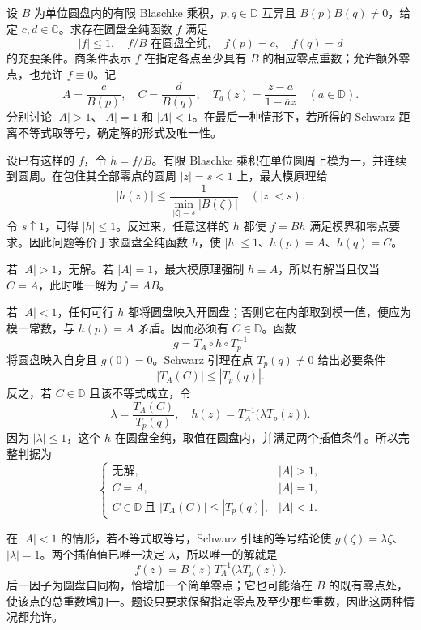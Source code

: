 \begin{exercise}[指定零点后的两点插值]\label{b3:ex:18-draft-07}
设 \(B\) 为单位圆盘内的有限 Blaschke 乘积，\(p,q\in\mathbb D\) 互异且 \(B(p)B(q)\ne0\)，给定 \(c,d\in\mathbb C\)。求存在圆盘全纯函数 \(f\) 满足
\[
 |f|\le1,\quad f/B\text{ 在圆盘全纯},\quad f(p)=c,\quad f(q)=d
\]
的充要条件。商条件表示 \(f\) 在指定各点至少具有 \(B\) 的相应零点重数；允许额外零点，也允许 \(f\equiv0\)。记
\[
 A=\frac{c}{B(p)},\quad C=\frac{d}{B(q)},\quad
 T_a(z)=\frac{z-a}{1-\overline a z}\quad(a\in\mathbb D).
\]
分别讨论 \(|A|>1\)、\(|A|=1\) 和 \(|A|<1\)。在最后一种情形下，若所得的 Schwarz 距离不等式取等号，确定解的形式及唯一性。
\end{exercise}
\begin{solution}
设已有这样的 \(f\)，令 \(h=f/B\)。有限 Blaschke 乘积在单位圆周上模为一，并连续到圆周。在包住其全部零点的圆周 \(|z|=s<1\) 上，最大模原理给
\[
 |h(z)|\le\frac1{\min_{|\zeta|=s}|B(\zeta)|}\quad(|z|<s).
\]
令 \(s\uparrow1\)，可得 \(|h|\le1\)。反过来，任意这样的 \(h\) 都使 \(f=Bh\) 满足模界和零点要求。因此问题等价于求圆盘全纯函数 \(h\)，使 \(|h|\le1\)、\(h(p)=A\)、\(h(q)=C\)。

若 \(|A|>1\)，无解。若 \(|A|=1\)，最大模原理强制 \(h\equiv A\)，所以有解当且仅当 \(C=A\)，此时唯一解为 \(f=AB\)。

若 \(|A|<1\)，任何可行 \(h\) 都将圆盘映入开圆盘；否则它在内部取到模一值，便应为模一常数，与 \(h(p)=A\) 矛盾。因而必须有 \(C\in\mathbb D\)。函数
\[
 g=T_A\circ h\circ T_p^{-1}
\]
将圆盘映入自身且 \(g(0)=0\)。Schwarz 引理在点 \(T_p(q)\ne0\) 给出必要条件
\[
 |T_A(C)|\le|T_p(q)|.
\]
反之，若 \(C\in\mathbb D\) 且该不等式成立，令
\[
 \lambda=\frac{T_A(C)}{T_p(q)},\quad
 h(z)=T_A^{-1}\bigl(\lambda T_p(z)\bigr).
\]
因为 \(|\lambda|\le1\)，这个 \(h\) 在圆盘全纯，取值在圆盘内，并满足两个插值条件。所以完整判据为
\[
 \begin{cases}
 \text{无解},&|A|>1,\\
 C=A,&|A|=1,\\
 C\in\mathbb D\ \text{且 }|T_A(C)|\le|T_p(q)|,&|A|<1.
 \end{cases}
\]

在 \(|A|<1\) 的情形，若不等式取等号，Schwarz 引理的等号结论使 \(g(\zeta)=\lambda\zeta\)、\(|\lambda|=1\)。两个插值值已唯一决定 \(\lambda\)，所以唯一的解就是
\[
 f(z)=B(z)T_A^{-1}\bigl(\lambda T_p(z)\bigr).
\]
后一因子为圆盘自同构，恰增加一个简单零点；它也可能落在 \(B\) 的既有零点处，使该点的总重数增加一。题设只要求保留指定零点及至少那些重数，因此这两种情况都允许。
\end{solution}

